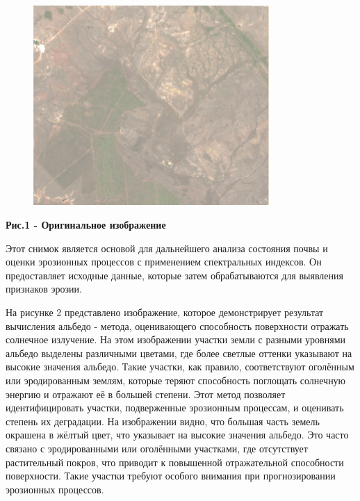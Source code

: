 \begin{figure}[H]
	\centering
	\includegraphics[width=0.8\textwidth]{media/ict/image32}
	\caption*{}
\end{figure}


{\bfseries Рис.1 - Оригинальное изображение}

Этот снимок является основой для дальнейшего анализа состояния почвы и
оценки эрозионных процессов с применением спектральных индексов. Он
предоставляет исходные данные, которые затем обрабатываются для
выявления признаков эрозии.

На рисунке 2 представлено изображение, которое демонстрирует результат
вычисления альбедо - метода, оценивающего способность поверхности
отражать солнечное излучение. На этом изображении участки земли с
разными уровнями альбедо выделены различными цветами, где более светлые
оттенки указывают на высокие значения альбедо. Такие участки, как
правило, соответствуют оголённым или эродированным землям, которые
теряют способность поглощать солнечную энергию и отражают её в большей
степени. Этот метод позволяет идентифицировать участки, подверженные
эрозионным процессам, и оценивать степень их деградации. На изображении
видно, что большая часть земель окрашена в жёлтый цвет, что указывает на
высокие значения альбедо. Это часто связано с эродированными или
оголёнными участками, где отсутствует растительный покров, что приводит
к повышенной отражательной способности поверхности. Такие участки
требуют особого внимания при прогнозировании эрозионных процессов.


